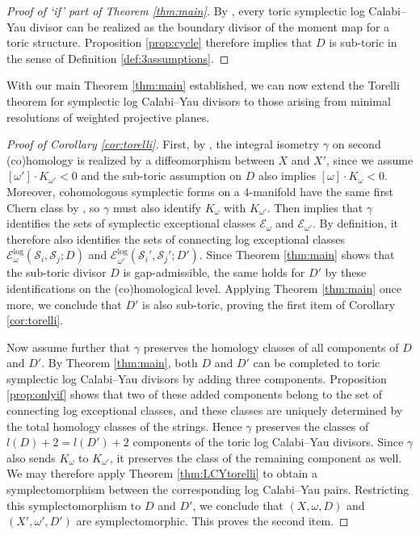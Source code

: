 \documentclass[11pt]{article}
\theoremstyle{definition}
\theoremstyle{remark}
\newcommand{\st}{\mathcal{S}}
\begin{document}
\begin{proof}[Proof of `if' part of Theorem \ref{thm:main}]
  By \cite[Theorem 1.5]{LMN22}, every toric symplectic log Calabi--Yau divisor can be realized as the boundary divisor of the moment map for a toric structure. Proposition \ref{prop:cycle} therefore implies that $D$ is sub-toric in the sense of Definition \ref{def:3assumptions}.
\end{proof}

With our main Theorem \ref{thm:main} established, we can now extend the Torelli theorem for symplectic log Calabi--Yau divisors to those arising from minimal resolutions of weighted projective planes.

\begin{proof}[Proof of Corollary \ref{cor:torelli}]
First, by \cite[Theorem 2.8]{LiLiAsian}, the integral isometry $\gamma$ on second (co)homology is realized by a diffeomorphism between $X$ and $X'$, since we assume $[\omega']\cdot K_{\omega'}<0$ and the sub-toric assumption on $D$ also implies $[\omega]\cdot K_\omega<0$. Moreover, cohomologous symplectic forms on a $4$-manifold have the same first Chern class by \cite[Corollary A]{Salamon}, so $\gamma$ must also identify $K_\omega$ with $K_{\omega'}$. Then \cite[Theorem A]{LiLiu96} implies that $\gamma$ identifies the sets of symplectic exceptional classes $\mathcal{E}_\omega$ and $\mathcal{E}_{\omega'}$. By definition, it therefore also identifies the sets of connecting log exceptional classes $\mathcal{E}_\omega^{\text{log}}(\st_i,\st_j;D)$ and $\mathcal{E}_{\omega'}^{\text{log}}(\st_i',\st_j';D')$. Since Theorem \ref{thm:main} shows that the sub-toric divisor $D$ is gap-admissible, the same holds for $D'$ by these identifications on the (co)homological level. Applying Theorem \ref{thm:main} once more, we conclude that $D'$ is also sub-toric, proving the first item of Corollary \ref{cor:torelli}.

Now assume further that $\gamma$ preserves the homology classes of all components of $D$ and $D'$. By Theorem \ref{thm:main}, both $D$ and $D'$ can be completed to toric symplectic log Calabi--Yau divisors by adding three components. Proposition \ref{prop:onlyif} shows that two of these added components belong to the set of connecting log exceptional classes, and these classes are uniquely determined by the total homology classes of the strings. Hence $\gamma$ preserves the classes of $l(D)+2=l(D')+2$ components of the toric log Calabi--Yau divisors. Since $\gamma$ also sends $K_\omega$ to $K_{\omega'}$, it preserves the class of the remaining component as well. We may therefore apply Theorem \ref{thm:LCYtorelli} to obtain a symplectomorphism between the corresponding log Calabi--Yau pairs. Restricting this symplectomorphism to $D$ and $D'$, we conclude that $(X,\omega,D)$ and $(X',\omega',D')$ are symplectomorphic. This proves the second item.

\end{proof}
\end{document}
